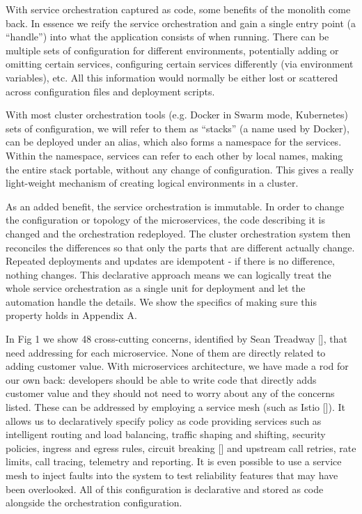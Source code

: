 \documentclass[reprint,amsmath,amssymb,aps]{revtex4-1}
\begin{document}
With service orchestration captured as code, some benefits of the monolith come back. In essence we reify the service orchestration and gain a single entry point (a “handle”) into what the application consists of when running. There can be multiple sets of configuration for different environments, potentially adding or omitting certain services, configuring certain services differently (via environment variables), etc. All this information would normally be either lost or scattered across configuration files and deployment scripts.

With most cluster orchestration tools (e.g. Docker in Swarm mode, Kubernetes) sets of configuration, we will refer to them as “stacks” (a name used by Docker), can be deployed under an alias, which also forms a namespace for the services. Within the namespace, services can refer to each other by local names, making the entire stack portable, without any change of configuration. This gives a really light-weight mechanism of creating logical environments in a cluster.

As an added benefit, the service orchestration is immutable. In order to change the configuration or topology of the microservices, the code describing it is changed and the orchestration redeployed. The cluster orchestration system then reconciles the differences so that only the parts that are different actually change. Repeated deployments and updates are idempotent - if there is no difference, nothing changes. This declarative approach means we can logically treat the whole service orchestration as a single unit for deployment and let the automation handle the details. We show the specifics of making sure this property holds in Appendix A.

In Fig 1 we show 48 cross-cutting concerns, identified by Sean Treadway [], that need addressing for each microservice. None of them are directly related to adding customer value. With microservices architecture, we have made a rod for our own back: developers should be able to write code that directly adds customer value and they should not need to worry about any of the concerns listed. These can be addressed by employing a service mesh (such as Istio []). It allows us to declaratively specify policy as code providing services such as intelligent routing and load balancing, traffic shaping and shifting, security policies, ingress and egress rules, circuit breaking [] and upstream call retries, rate limits, call tracing, telemetry and reporting. It is even possible to use a service mesh to inject faults into the system to test reliability features that may have been overlooked. All of this configuration is declarative and stored as code alongside the orchestration configuration.
\end{document}
